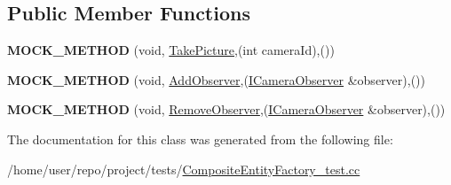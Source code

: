\subsection*{Public Member Functions}
\begin{DoxyCompactItemize}
\item 
\mbox{\label{classMockCameraController_aa7ea2072d82ab098f0c475ab21aeaba7}} 
{\bfseries M\+O\+C\+K\+\_\+\+M\+E\+T\+H\+OD} (void, \hyperlink{classICameraController_af9fff22819969ca260f7f098f0cdebf4}{Take\+Picture},(int camera\+Id),())
\item 
\mbox{\label{classMockCameraController_a521d742b73cabd1420cb515e7d461baa}} 
{\bfseries M\+O\+C\+K\+\_\+\+M\+E\+T\+H\+OD} (void, \hyperlink{classICameraController_ad3cf56dc052984b0e31e602f344c35db}{Add\+Observer},(\hyperlink{classICameraObserver}{I\+Camera\+Observer} \&observer),())
\item 
\mbox{\label{classMockCameraController_a97e36ca282c75d2ff6c22c82bda780ea}} 
{\bfseries M\+O\+C\+K\+\_\+\+M\+E\+T\+H\+OD} (void, \hyperlink{classICameraController_a5013bc29f6a0e7794a97646d868bf809}{Remove\+Observer},(\hyperlink{classICameraObserver}{I\+Camera\+Observer} \&observer),())
\end{DoxyCompactItemize}


The documentation for this class was generated from the following file\+:\begin{DoxyCompactItemize}
\item 
/home/user/repo/project/tests/\hyperlink{CompositeEntityFactory__test_8cc}{Composite\+Entity\+Factory\+\_\+test.\+cc}\end{DoxyCompactItemize}
